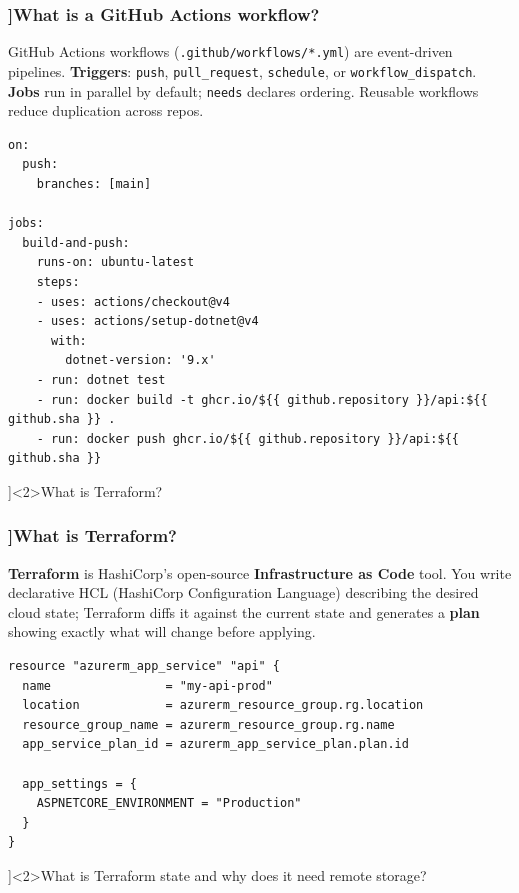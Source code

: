 \begin{frame}[fragile]
  \frametitle{\AnswerTitle[\CategoryBadge[CICDColor!20]{CI/CD \& IaC}]{What is a GitHub Actions workflow?}}

  {\footnotesize
  GitHub Actions workflows (\texttt{.github/workflows/*.yml}) are event-driven pipelines. \textbf{Triggers}: \texttt{push}, \texttt{pull\_request}, \texttt{schedule}, or \texttt{workflow\_dispatch}. \textbf{Jobs} run in parallel by default; \texttt{needs} declares ordering. Reusable workflows reduce duplication across repos.
  }

  \begin{verbatim}
on:
  push:
    branches: [main]

jobs:
  build-and-push:
    runs-on: ubuntu-latest
    steps:
    - uses: actions/checkout@v4
    - uses: actions/setup-dotnet@v4
      with:
        dotnet-version: '9.x'
    - run: dotnet test
    - run: docker build -t ghcr.io/${{ github.repository }}/api:${{ github.sha }} .
    - run: docker push ghcr.io/${{ github.repository }}/api:${{ github.sha }}
  \end{verbatim}
\end{frame}

\QuestionSlide[\CategoryBadge[CICDColor!20]{CI/CD \& IaC}]<2>{What is Terraform?}

\begin{frame}[fragile]
  \frametitle{\AnswerTitle[\CategoryBadge[CICDColor!20]{CI/CD \& IaC}]{What is Terraform?}}

  {\footnotesize
  \textbf{Terraform} is HashiCorp's open-source \textbf{Infrastructure as Code} tool. You write declarative HCL (HashiCorp Configuration Language) describing the desired cloud state; Terraform diffs it against the current state and generates a \textbf{plan} showing exactly what will change before applying.
  }

  \begin{verbatim}
resource "azurerm_app_service" "api" {
  name                = "my-api-prod"
  location            = azurerm_resource_group.rg.location
  resource_group_name = azurerm_resource_group.rg.name
  app_service_plan_id = azurerm_app_service_plan.plan.id

  app_settings = {
    ASPNETCORE_ENVIRONMENT = "Production"
  }
}
  \end{verbatim}
\end{frame}

\QuestionSlide[\CategoryBadge[CICDColor!20]{CI/CD \& IaC}]<2>{What is Terraform state and why does it need remote storage?}

